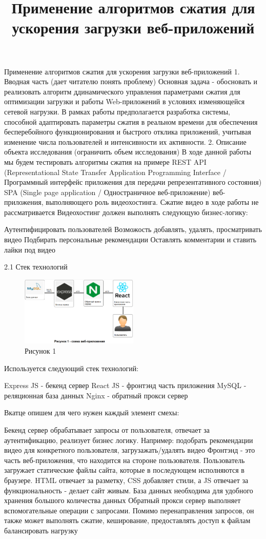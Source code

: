 \documentclass[12pt]{article}
\title{Применение алгоритмов сжатия для ускорения загрузки веб-приложений}
\author{}
\date{}
\begin{document}
\maketitle

Применение алгоритмов сжатия для ускорения загрузки веб-приложений
1. Вводная часть (дает читателю понять проблему)
Основная задача - обосновать и реализовать алгоритм ддинамического управления параметрами сжатия для оптимизации загрузки и работы Web-приложений в условиях изменяющейся сетевой нагрузки. В рамках работы предполагается разработка системы, способной адаптировать параметры сжатия в реальном времени для обеспечения бесперебойного функционирования и быстрого отклика приложений, учитывая изменение числа пользователей и интенсивности их активности.
2. Описание объекта исследования (ограничить объем исследования)
В ходе данной работы мы будем тестировать алгоритмы сжатия на примере REST API (Representational State Transfer Application Programming Interface / Программный интерфейс приложения для передачи репрезентативного состояния) SPA (Single page application / Одностраничное веб-приложение) веб-приложения, выполняющего роль видеохостинга. Сжатие видео в ходе работы не рассматривается
Видеохостинг должен выполнять следующую бизнес-логику:

Аутентифицировать пользователей
Возможость добавлять, удалять, просматривать видео
Подбирать персональные рекомендации
Оставлять комментарии и ставить лайки под видео

2.1 Стек технологий
\begin{figure}[h!]
\centering
\includegraphics[width=0.5\textwidth]{../images/Схема_веб-приложения.png}
\caption{Рисунок 1}
\end{figure}

Используется следующий стек технологий:

Express JS - бекенд сервер
React JS - фронтэнд часть приложения
MySQL - реляционная база данных
Nginx - обратный прокси сервер

Вкатце опишем для чего нужен каждый элемент смехы:

Бекенд сервер обрабатывает запросы от пользователя, отвечает за аутентификацию, реализует бизнес логику. Например: подобрать рекомендации видео для конкретного пользователя, загрузажать/удалять видео
Фронтэнд - это часть веб-приложения, что находится на стороне пользователя. Пользователь загружает статические файлы сайта,
которые в последующем исполняются в браузере. HTML отвечает за разметку, CSS добавляет стили, а JS отвечает за функциональность - делает сайт живым.
База данных необходима для удобного хранения большого количества данных
Обратный прокси сервер выполняет вспомогательные операции с запросами. Помимо перенаправления запросов, он также может выполнять сжатие, кеширование, предоставлять доступ к файлам
балансировать нагрузку
\end{document}

